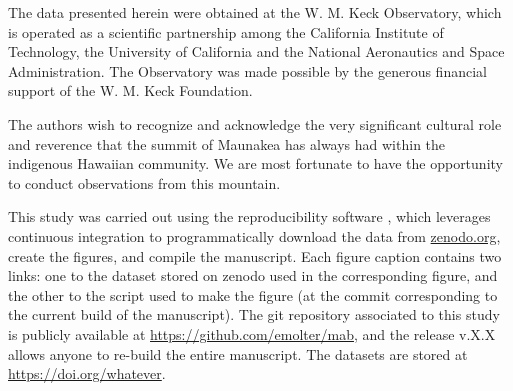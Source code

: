 \documentclass[preprint]{aastex631}
\begin{document}


\begin{acknowledgements}

The data presented herein were obtained at the W. M. Keck Observatory, which is operated as a scientific partnership among the California Institute of Technology, the University of California and the National Aeronautics and Space Administration. The Observatory was made possible by the generous financial support of the W. M. Keck Foundation.

The authors wish to recognize and acknowledge the very significant cultural role and reverence that the summit of Maunakea has always had within the indigenous Hawaiian community.  We are most fortunate to have the opportunity to conduct observations from this mountain.

This study was carried out using the reproducibility software
\href{https://github.com/showyourwork/showyourwork}{\showyourwork}
\citep{luger21}, which leverages continuous integration to
programmatically download the data from
\href{https://zenodo.org/}{zenodo.org}, create the figures, and
compile the manuscript. Each figure caption contains two links: one
to the dataset stored on zenodo used in the corresponding figure,
and the other to the script used to make the figure (at the commit
corresponding to the current build of the manuscript). The git
repository associated to this study is publicly available at
\url{https://github.com/emolter/mab}, and the release
v.X.X allows anyone to re-build the entire manuscript. The datasets
are stored at \url{https://doi.org/whatever}.

\end{acknowledgements}
\end{document}
